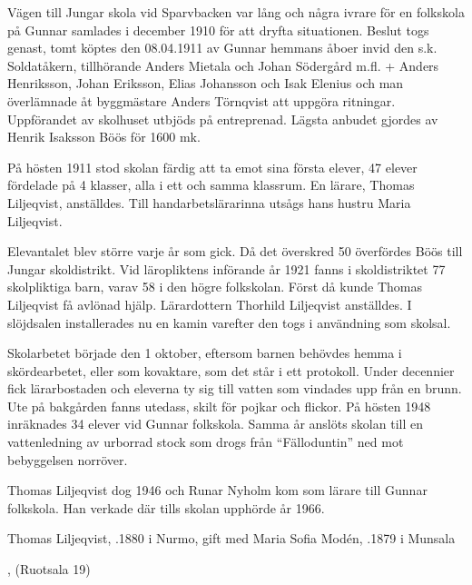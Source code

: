 Vägen till Jungar skola vid Sparvbacken var lång och några ivrare för en folkskola på Gunnar samlades i december 1910 för att dryfta situationen. Beslut togs genast, tomt köptes den 08.04.1911 av Gunnar hemmans åboer invid den s.k. Soldatåkern, tillhörande Anders Mietala och Johan Södergård m.fl. + Anders Henriksson, Johan Eriksson, Elias Johansson och Isak Elenius och man överlämnade åt byggmästare Anders Törnqvist att uppgöra ritningar. Uppförandet av skolhuset utbjöds på entreprenad. Lägsta anbudet gjordes av Henrik Isaksson Böös för 1600 mk.

På hösten 1911 stod skolan färdig att ta emot sina första elever, 47 elever fördelade på 4 klasser, alla i ett och samma klassrum. En lärare, Thomas Liljeqvist, anställdes. Till handarbetslärarinna utsågs hans hustru Maria Liljeqvist.

Elevantalet blev större varje år som gick. Då det överskred 50 överfördes Böös till Jungar skoldistrikt. Vid läropliktens införande år 1921 fanns i skoldistriktet 77 skolpliktiga barn, varav 58 i den högre folkskolan. Först då kunde Thomas Liljeqvist få avlönad hjälp. Lärardottern Thorhild Liljeqvist anställdes. I slöjdsalen installerades nu en kamin varefter den togs i användning som skolsal.

Skolarbetet började den 1 oktober, eftersom barnen behövdes hemma i skördearbetet, eller som kovaktare, som det står i ett protokoll. Under decennier fick lärarbostaden och eleverna ty sig till vatten som vindades upp från en brunn. Ute på bakgården fanns utedass, skilt för pojkar och flickor. På hösten 1948 inräknades 34 elever vid Gunnar folkskola. Samma år anslöts skolan till en vattenledning av urborrad stock som drogs från ``Fälloduntin'' ned mot bebyggelsen norröver.

Thomas Liljeqvist dog 1946 och Runar Nyholm kom som lärare till Gunnar folkskola. Han verkade där tills skolan upphörde år 1966.



Thomas Liljeqvist, .1880 i Nurmo, gift med Maria Sofia Modén,  .1879 i Munsala

\begin{jhchildren}
  \item {}
  \item {}
  \item {}
  \item {}
  \item {}, (Ruotsala 19)
\end{jhchildren}

